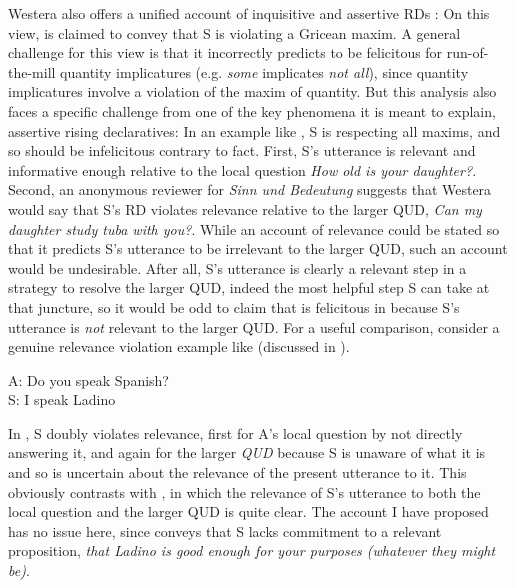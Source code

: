 \documentclass[output=paper,colorlinks,citecolor=brown]{langscibook}
\begin{document}
	Westera also offers a unified account of inquisitive and assertive RDs \citep{westera13, westera17, westera18}: On this view, \rise is claimed to convey that S is violating a Gricean maxim. A general challenge for this view is that it incorrectly predicts \rise to be felicitous for run-of-the-mill quantity implicatures (e.g. \emph{some} implicates \emph{not all}), since quantity implicatures involve a violation of the maxim of quantity. But this analysis also faces a specific challenge from one of the key phenomena it is meant to explain, assertive rising declaratives: In an example like , S is respecting all maxims, and so \rise should be infelicitous contrary to fact. First, S's utterance is relevant and informative enough relative to the local question \emph{How old is your daughter?}. Second, an anonymous reviewer for \emph{Sinn und Bedeutung} suggests that Westera would say that S's RD  violates relevance relative to the larger QUD, \emph{Can my daughter study tuba with you?}. While an account of relevance could be stated so that it predicts S's utterance to be irrelevant to the larger QUD, such an account would be undesirable. After all, S's utterance is clearly a relevant step in a strategy to resolve the larger {QUD}, indeed the most helpful step S can take at that juncture, so it would be odd to claim that \rise is felicitous in  because S's utterance is \emph{not} relevant to the larger {QUD}. For a useful comparison, consider a genuine relevance violation example like  (discussed in \citealt{westera13}).

\begin{exe}
	A: Do you speak Spanish?\\
	S: I speak Ladino\rise {}
\end{exe}

	In , S doubly violates relevance, first for A's local question by not directly answering it, and again for the larger \emph{QUD} because S is unaware of what it is and so is uncertain about the relevance of the present utterance to it. This obviously contrasts with , in which the relevance of S's utterance to both the local question and the larger {QUD} is quite clear. The account I have proposed has no issue here, since \rise conveys that S lacks commitment to a relevant proposition, \emph{that Ladino is good enough for your purposes (whatever they might be)}. 
	
	
	
\end{document}
